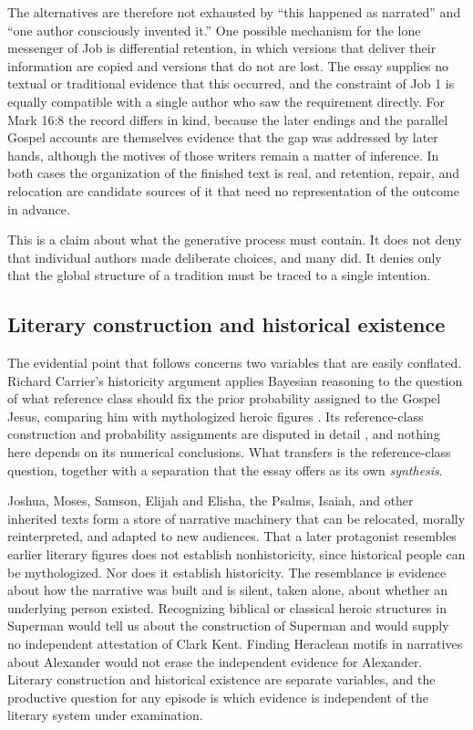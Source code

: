 \documentclass[11pt]{article}
\begin{document}
The alternatives are therefore not exhausted by ``this happened as narrated'' and ``one author consciously invented it.'' One possible mechanism for the lone messenger of Job is differential retention, in which versions that deliver their information are copied and versions that do not are lost. The essay supplies no textual or traditional evidence that this occurred, and the constraint of Job 1 is equally compatible with a single author who saw the requirement directly. For Mark 16:8 the record differs in kind, because the later endings and the parallel Gospel accounts are themselves evidence that the gap was addressed by later hands, although the motives of those writers remain a matter of inference. In both cases the organization of the finished text is real, and retention, repair, and relocation are candidate sources of it that need no representation of the outcome in advance.

This is a claim about what the generative process must contain. It does not deny that individual authors made deliberate choices, and many did. It denies only that the global structure of a tradition must be traced to a single intention.

\subsection{Literary construction and historical existence}

The evidential point that follows concerns two variables that are easily conflated. Richard Carrier's historicity argument applies Bayesian reasoning to the question of what reference class should fix the prior probability assigned to the Gospel Jesus, comparing him with mythologized heroic figures \cite{carrier1,carrier2}. Its reference-class construction and probability assignments are disputed in detail \cite{gullotta}, and nothing here depends on its numerical conclusions. What transfers is the reference-class question, together with a separation that the essay offers as its own \emph{synthesis}.

Joshua, Moses, Samson, Elijah and Elisha, the Psalms, Isaiah, and other inherited texts form a store of narrative machinery that can be relocated, morally reinterpreted, and adapted to new audiences. That a later protagonist resembles earlier literary figures does not establish nonhistoricity, since historical people can be mythologized. Nor does it establish historicity. The resemblance is evidence about how the narrative was built and is silent, taken alone, about whether an underlying person existed. Recognizing biblical or classical heroic structures in Superman would tell us about the construction of Superman and would supply no independent attestation of Clark Kent. Finding Heraclean motifs in narratives about Alexander would not erase the independent evidence for Alexander. Literary construction and historical existence are separate variables, and the productive question for any episode is which evidence is independent of the literary system under examination.
\end{document}
